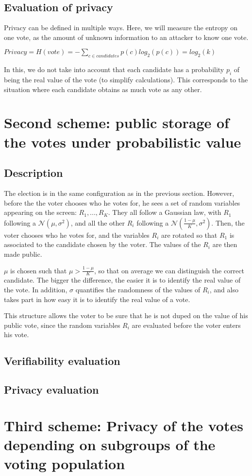 \documentclass{article}
\begin{document}
\subsection{Evaluation of privacy}

Privacy can be defined in multiple ways. Here, we will measure the entropy on one vote, as the amount of unknown information to an attacker to know one vote.

$Privacy=H(vote)=-\sum\limits_{c \in candidates} p(c)log_2(p(c))=log_2(k)$

In this, we do not take into account that each candidate has a probability $p_i$ of being the real value of the vote (to simplify calculations). This corresponds to the situation where each candidate obtains as much vote as any other.


\section{Second scheme: public storage of the votes under probabilistic value}


\subsection{Description}

The election is in the same configuration as in the previous section. However, before the the voter chooses who he votes for, he sees a set of random variables appearing on the screen: $R_1, ..., R_K$. They all follow a Gaussian law, with $R_1$ following a $\mathcal{N}(\mu, \sigma^2)$, and all the other $R_i$ following a $\mathcal{N}(\frac{1-\mu}{K}, \sigma^2)$. Then, the voter chooses who he votes for, and the variables $R_i$ are rotated so that $R_1$ is associated to the candidate chosen by the voter. The values of the $R_i$ are then made public. 

$\mu$ is chosen such that $\mu > \frac{1-\mu}{K}$, so that on average we can distinguish the correct candidate. The bigger the difference, the easier it is to identify the real value of the vote. In addition, $\sigma$ quantifies the randomness of the values of $R_i$, and also takes part in how easy it is to identify the real value of a vote.

\bigbreak

This structure allows the voter to be sure that he is not duped on the value of his public vote, since the random variables $R_i$ are evaluated before the voter enters his vote.


\subsection{Verifiability evaluation}



\subsection{Privacy evaluation}


\section{Third scheme: Privacy of the votes depending on subgroups of the voting population}
\end{document}
